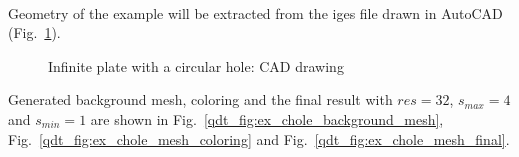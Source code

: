 \paragraph{}
Geometry of the example will be extracted from the iges file drawn in AutoCAD (Fig.~\ref{qdt_fig:ex_chole_cad}).
    \begin{figure}[H]
        \centering
        \caption{Infinite plate with a circular hole: CAD drawing}
        \label{qdt_fig:ex_chole_cad}        
    \end{figure}
%
Generated background mesh, coloring and the final result with $res=32$, $s_{max}=4$ and $s_{min}=1$ are shown in Fig.~\ref{qdt_fig:ex_chole_background_mesh}, Fig.~\ref{qdt_fig:ex_chole_mesh_coloring} and Fig.~\ref{qdt_fig:ex_chole_mesh_final}.

